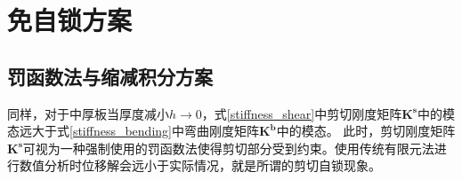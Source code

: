 \section{免自锁方案}
\subsection{罚函数法与缩减积分方案}
同样，对于中厚板当厚度减小$h\rightarrow 0$，式\eqref{stiffness_shear}中剪切刚度矩阵$\boldsymbol{K^s}$中的模态远大于式\eqref{stiffness_bending}中弯曲刚度矩阵$\boldsymbol{K^b}$中的模态。
此时，剪切刚度矩阵$\boldsymbol{K^s}$可视为一种强制使用的罚函数法使得剪切部分受到约束。使用传统有限元法进行数值分析时位移解会远小于实际情况，就是所谓的剪切自锁现象。